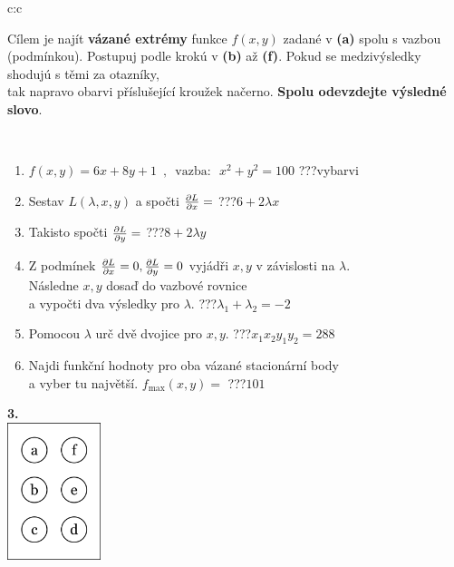 \documentclass[10pt]{report}
\begin{document}
\begin{tabular}{c:c}
\begin{minipage}[c][104.5mm][t]{0.5\linewidth}
\begin{center}
\begin{minipage}{0.95\linewidth}
\begin{center}
Cílem je najít \textbf{vázané extrémy} funkce $f(x,y)$ zadané v \textbf{(a)} spolu s vazbou (podmínkou). Postupuj podle krokú v \textbf{(b)} až \textbf{(f)}. Pokud se medzivýsledky shodujú s těmi za otazníky,\\tak napravo obarvi příslušející kroužek načerno. \textbf{Spolu odevzdejte výsledné slovo}.
\end{center}
\end{minipage}
\\[1mm]
\begin{minipage}{0.79\linewidth}
\begin{center}
\begin{varwidth}{\linewidth}
\begin{enumerate}
\normalsize
\item $f(x,y)=6x+8y+1 \enspace , \enspace \mathrm{vazba:} \enspace x^2+y^2=100$\quad \dotfill\; ???\;\dotfill \quad vybarvi
\item Sestav $L(\lambda,x,y)$ a spočti $\pdv{L}{x}=$\quad \dotfill\; ???\;\dotfill \quad $6+2\lambda x$
\item Takisto spočti $\pdv{L}{y}=$\quad \dotfill\; ???\;\dotfill \quad $8+2\lambda y$
\item Z podmínek $\pdv{L}{x}=0 , \pdv{L}{y}=0$ vyjádři $x,y$ v závislosti na $\lambda$.\\ \phantom{xxxxxx}Následne $x,y$ dosaď do vazbové rovnice\\ \phantom{xxxxxx}a vypočti dva výsledky pro $\lambda$.\quad \dotfill\; ???\;\dotfill \quad $\lambda_1+\lambda_2=-2$
\item Pomocou $\lambda$ urč dvě dvojice pro $x,y$.\quad \dotfill\; ???\;\dotfill \quad $x_1 x_2 y_1 y_2=288$
\item Najdi funkční hodnoty pro oba vázané stacionární body\\ \phantom{xxxxxx}a vyber tu najvětší. $f_{\text{max}}(x,y)=$\quad \dotfill\; ???\;\dotfill \quad $101$
\end{enumerate}
\end{varwidth}
\end{center}
\end{minipage}
\begin{minipage}{0.20\linewidth}
\begin{center}
{\Huge\bfseries 3.} \\[2mm]
\includegraphics[height=40mm]{../images/braille.png}

\end{center}
\end{minipage}
\end{center}
\end{minipage}
\end{tabular}
\end{document}
